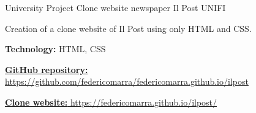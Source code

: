 \begin{cventries}
  \cventry
    {University Project} %
    {Clone website newspaper Il Post} %
    {UNIFI} %
    {} %
    {
      \begin{cvitems} %
        \item {Creation of a clone website of Il Post using only HTML and CSS.}
        \item {\textbf{Technology:} HTML, CSS}
        \item {\href{https://github.com/federicomarra/federicomarra.github.io/ilpost}{\textbf{GitHub repository:} https://github.com/federicomarra/federicomarra.github.io/ilpost}}
        \item {\href{https://federicomarra.github.io/ilpost/}{\textbf{Clone website:} https://federicomarra.github.io/ilpost/}}
      \end{cvitems}
    }


\end{cventries}
